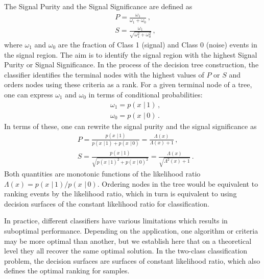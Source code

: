 \documentclass[prd, twocolumn, lengthcheck, superscriptaddress, showpacs, letterpaper, nofootinbib]{revtex4-1}
\newcommand\given{\,\,|\,}
\newcommand\auxvec{x}
\begin{document}
The Signal Purity and the Signal Significance are defined as
\begin{align}
\label{PSdefs}
&P = \frac{\omega_1}{\omega_1 +\omega_0}\,, \\
&S = \frac{\omega_1}{\sqrt{\omega_1^2 +\omega_0^2}}\,,
\end{align}
where $\omega_1$ and $\omega_0$ are the fraction of Class 1 (signal) and Class 0 (noise) events in the signal region. The aim is to identify the signal region with the highest Signal Purity or Signal Significance. In the process of the decision tree construction, the classifier identifies the terminal nodes with the highest values of  $P$ or $S$ and orders nodes using these criteria as a rank. For a given terminal node of a tree, one can express $\omega_1$ and $\omega_0$ in terms of conditional probabilities:
\begin{align}
\label{omegasprobs}
&\omega_1 = p(\auxvec \given 1)\,, \\
&\omega_0 = p(\auxvec \given 0) \,.
\end{align}
In terms of these, one can rewrite the signal purity and the signal significance as
\begin{align}
\label{PSin_probs}
&P = \frac{p(\auxvec \given 1)}{p(\auxvec \given 1) + p(\auxvec \given 0)} = \frac{\Lambda(\auxvec)}{\Lambda(\auxvec) + 1}\,, \\
&S = \frac{p(\auxvec \given 1)}{\sqrt{p(\auxvec \given 1)^2 + p(\auxvec \given 0)^2}} = \frac{\Lambda(\auxvec)}{\sqrt{\Lambda^2(\auxvec) + 1}}\,.
\end{align}
Both quantities are monotonic functions of the likelihood ratio $\Lambda(\auxvec) = p(\auxvec \given 1)/p(\auxvec \given 0)$. Ordering nodes in the tree would be equivalent to ranking events by the likelihood ratio, which in turn is equivalent to using decision surfaces of the constant likelihood ratio for classification. 

In practice, different classifiers have various limitations which results in suboptimal performance. Depending on the application, one algorithm or criteria may be more optimal than another, but we establish here that on a theoretical level they all recover the same optimal solution. In the two-class classification problem, the decision surfaces are surfaces of constant likelihood ratio, which also defines the optimal ranking for samples.             
 

% 




\end{document}
